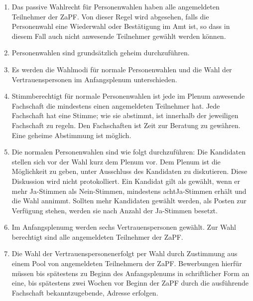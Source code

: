 \documentclass[draft,12pt,oneside]{scrreprt}
\begin{document}
\begin{enumerate}

  \item Das passive Wahlrecht für Personenwahlen haben alle angemeldeten Teilnehmer
        der ZaPF. Von dieser Regel wird abgesehen, falls die Personenwahl eine
        Wiederwahl oder Bestätigung im Amt ist, so dass in diesem Fall auch nicht
        anwesende Teilnehmer gewählt werden können.

  \item Personenwahlen sind grundsätzlich geheim durchzuführen.

  \item Es werden die Wahlmodi für normale Personenwahlen und die Wahl der
        Vertrauenspersonen im Anfangsplenum unterschieden.

  \item Stimmberechtigt für normale Personenwahlen ist jede im Plenum anwesende
        Fachschaft die mindestens einen angemeldeten Teilnehmer hat.\label{it:stimmberechtigtabstimmungen}
        Jede Fachschaft hat eine Stimme; wie sie abstimmt, ist innerhalb der
        jeweiligen Fachschaft zu regeln.
        Den Fachschaften ist Zeit zur Beratung zu gewähren.
        Eine geheime Abstimmung ist möglich.

  \item Die normalen Personenwahlen sind wie folgt durchzuführen:
        Die Kandidaten stellen sich vor der Wahl kurz dem Plenum vor.
        Dem Plenum ist die Möglichkeit zu geben, unter Ausschluss des Kandidaten
        zu diskutieren.
        Diese Diskussion wird nicht protokolliert.
        Ein Kandidat gilt als gewählt, wenn er mehr Ja-Stimmen als Nein-Stimmen,
        mindestens acht\footnotemark Ja-Stimmen erhält und die Wahl annimmt.
        Sollten mehr Kandidaten gewählt werden, als Posten zur Verfügung stehen,
        werden sie nach Anzahl der Ja-Stimmen besetzt.

  \item Im Anfangsplenumg werden sechs Vertrauenspersonen gewählt. Zur Wahl
        berechtigt sind alle angemeldeten Teilnehmer der ZaPF.

  \item Die Wahl der Vertrauenspersonen\footnotemark erfolgt per Wahl durch
        Zustimmung aus einem Pool von angemeldeten Teilnehmern der ZaPF.
        Bewerbungen hierfür müssen bis spätestens zu Beginn des Anfangsplenums
        in schriftlicher Form an eine, bis spätestens zwei Wochen vor Beginn der
        ZaPF durch die ausführende Fachschaft bekanntzugebende, Adresse erfolgen.


\end{enumerate}
\end{document}
